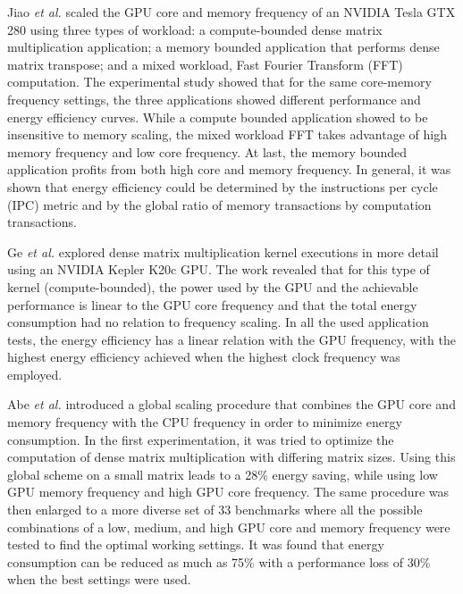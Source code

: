 Jiao \textit{et al.} \cite{jiao_power_2010} scaled the GPU core and memory frequency of an NVIDIA Tesla GTX 280 using three types of workload: a compute-bounded dense matrix multiplication application; a memory bounded application that performs dense matrix transpose; and a mixed workload, Fast Fourier Transform (FFT) computation. The experimental study showed that for the same core-memory frequency settings, the three applications showed different performance and energy efficiency curves. While a compute bounded application showed to be insensitive to memory scaling, the mixed workload FFT takes advantage of high memory frequency and low core frequency. At last, the memory bounded application profits from both high core and memory frequency. In general, it was shown that energy efficiency could be determined by the instructions per cycle (IPC) metric and by the global ratio of memory transactions by computation transactions.

Ge \textit{et al.} \cite{ge_effects_2013} explored dense matrix multiplication kernel executions in more detail using an NVIDIA Kepler K20c GPU.  The work revealed that for this type of kernel (compute-bounded), the power used by the GPU and the achievable performance is linear to the GPU core frequency and that the total energy consumption had no relation to frequency scaling. In all the used application tests, the energy efficiency has a linear relation with the GPU frequency, with the highest energy efficiency achieved when the highest clock frequency was employed.

Abe \textit{et al.} \cite{abe_power_2012} introduced a global scaling procedure that combines the GPU core and memory frequency with the CPU frequency in order to minimize energy consumption. In the first experimentation, it was tried to optimize the computation of dense matrix multiplication with differing matrix sizes. Using this global scheme on a small matrix leads to a 28\% energy saving, while using low GPU memory frequency and high GPU core frequency. The same procedure was then enlarged to a more diverse set of 33 benchmarks where all the possible combinations of a low, medium, and high GPU core and memory frequency were tested to find the optimal working settings. It was found that energy consumption can be reduced as much as 75\% with a performance loss of 30\% when the best settings were used. 

